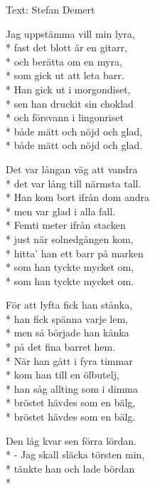 \begin{SongText}
\begin{SongInfo}
    Text: Stefan Demert
\end{SongInfo}
\begin{SongVerse}
Jag uppstämma vill min lyra,\\*%
fast det blott är en gitarr,\\*%
och berätta om en myra,\\*%
som gick ut att leta barr.\\*%
Han gick ut i morgondiset,\\*%
sen han druckit sin choklad\\*%
och försvann i lingonriset\\*%
både mätt och nöjd och glad,\\*%
både mätt och nöjd och glad.
\end{SongVerse}
\begin{SongVerse}
Det var långan väg att vandra\\*%
det var lång till närmsta tall.\\*%
Han kom bort ifrån dom andra\\*%
men var glad i alla fall.\\*%
Femti meter ifrån stacken\\*%
just när solnedgången kom,\\*%
hitta' han ett barr på marken\\*%
som han tyckte mycket om,\\*%
som han tyckte mycket om.
\end{SongVerse}
\begin{SongVerse}
För att lyfta fick han stånka,\\*%
han fick spänna varje lem,\\*%
men så började han kånka\\*%
på det fina barret hem.\\*%
När han gått i fyra timmar\\*%
kom han till en ölbutelj,\\*%
han såg allting som i dimma\\*%
bröstet hävdes som en bälg,\\*%
bröstet hävdes som en bälg.
\end{SongVerse}
\begin{SongVerse}
Den låg kvar sen förra lördan.\\*%
- Jag skall släcka törsten min,\\*%
tänkte han och lade bördan\\*%

\end{SongVerse}
\end{SongText}
